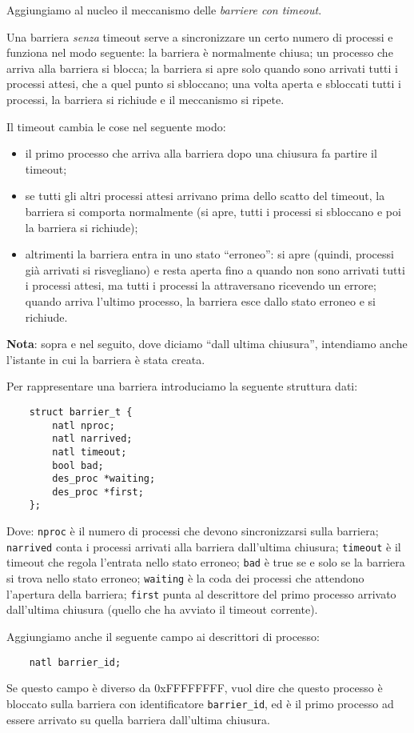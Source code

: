 Aggiungiamo al nucleo il meccanismo delle {\em barriere con timeout}.

Una barriera {\em senza} timeout serve a sincronizzare un certo
numero di processi e
funziona nel modo seguente: la barriera \`e normalmente chiusa;
un processo che arriva alla barriera si blocca;
la barriera si apre solo quando sono arrivati tutti i processi attesi, che a
quel punto si sbloccano; una volta aperta e sbloccati tutti i processi,
la barriera si richiude e il meccanismo si ripete.

Il timeout cambia le cose nel seguente modo:
\begin{itemize}
  \item il primo processo che arriva alla barriera dopo una chiusura fa partire il timeout;
  \item se tutti gli altri processi attesi arrivano prima dello scatto
    del timeout, la barriera si comporta normalmente (si apre, tutti
    i processi si sbloccano e poi la barriera si richiude);
  \item altrimenti la barriera entra in uno stato ``erroneo'':
    si apre (quindi,  processi gi\`a arrivati 
    si risvegliano) e resta aperta fino a quando non sono arrivati
    tutti i processi attesi, ma tutti i processi la attraversano
    ricevendo un errore; quando arriva l'ultimo processo, la barriera
    esce dallo stato erroneo e si richiude.
\end{itemize}
{\bf Nota}: sopra e nel seguito, dove diciamo ``dall ultima chiusura'', intendiamo
anche l'istante in cui la barriera \`e stata creata.

Per rappresentare una barriera introduciamo la seguente struttura dati:
\begin{verbatim}
    struct barrier_t {
        natl nproc;
        natl narrived;
        natl timeout;
        bool bad;
        des_proc *waiting;
        des_proc *first;
    };
\end{verbatim}
Dove: \verb|nproc| \`e il numero di processi che devono sincronizzarsi sulla barriera;
\verb|narrived| conta i processi arrivati alla barriera dall'ultima chiusura;
\verb|timeout| \`e il timeout che regola l'entrata
nello stato erroneo; \verb|bad| \`e true se e solo se la barriera si trova nello stato erroneo;
\verb|waiting| \`e la coda dei processi che attendono
l'apertura della barriera; \verb|first| punta al descrittore del primo processo arrivato dall'ultima chiusura
(quello che ha avviato il timeout corrente).

Aggiungiamo anche il seguente campo ai descrittori di processo:
\begin{verbatim}
    natl barrier_id;
\end{verbatim}
Se questo campo \`e diverso da 0xFFFFFFFF, vuol dire che questo processo \`e bloccato
sulla barriera con identificatore \verb|barrier_id|, ed \`e il primo processo ad essere arrivato
su quella barriera dall'ultima chiusura.

